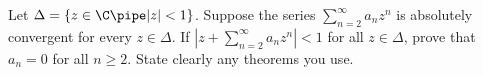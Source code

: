 Let $\Delta=\{z\in \C \pipe |z|<1\}$. Suppose the series
$\sum_{n=2}^{\infty}a_nz^n$ is absolutely convergent for every $z\in
\Delta$.  If $|z+\sum_{n=2}^{\infty}a_nz^n|<1$ for all $z\in \Delta$,
prove that $a_n=0$ for all $n\geq 2$. State clearly any theorems you
use.
